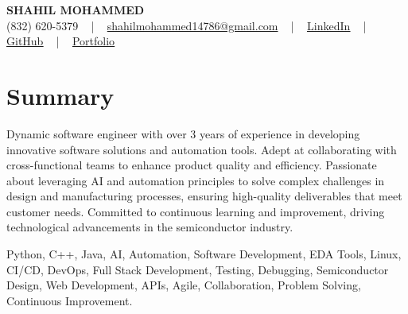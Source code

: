 \documentclass[letterpaper,10pt]{article}
\begin{document}
\begin{center}
    {\fontsize{14pt}{12pt}\selectfont \textbf{\MakeUppercase{Shahil Mohammed}}}\\ \vspace{2pt}
    \fontsize{10pt}{12pt}\selectfont (832) 620-5379 ~ | ~ \href{mailto:shahilmohammed14786@gmail.com}{shahilmohammed14786@gmail.com} ~ | ~  
    \href{https://www.linkedin.com/in/shahil-mohammed-9652931a1/}{\color{blue}\underline{LinkedIn}}  ~ | ~ 
    \href{https://github.com/freakbeast14}{\color{blue}\underline{GitHub}} ~ | ~ 
    \href{https://shahil-mohammed.netlify.app/}{\color{blue}\underline{Portfolio}}
    \vspace{-8pt}
\end{center}

\section{Summary}
\vspace{-2pt}\fontsize{8pt}{9pt}\selectfont
Dynamic software engineer with over 3 years of experience in developing innovative software solutions and automation tools. Adept at collaborating with cross-functional teams to enhance product quality and efficiency. Passionate about leveraging AI and automation principles to solve complex challenges in design and manufacturing processes, ensuring high-quality deliverables that meet customer needs. Committed to continuous learning and improvement, driving technological advancements in the semiconductor industry.
 \vspace{-5pt}
 
{\fontsize{1pt}{1pt}\selectfont\color{white}
Python, C++, Java, AI, Automation, Software Development, EDA Tools, Linux, CI/CD, DevOps, Full Stack Development, Testing, Debugging, Semiconductor Design, Web Development, APIs, Agile, Collaboration, Problem Solving, Continuous Improvement.
}
\vspace{-8pt}

\vspace{-2pt}
\end{document}
